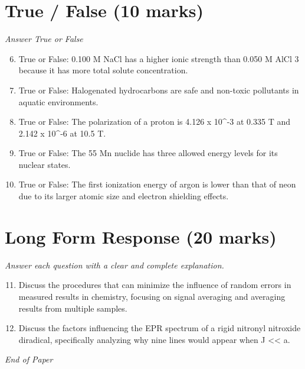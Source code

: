 \documentclass[12pt]{article}
\begin{document}
\section*{True / False (10 marks)}
\textit{Answer True or False}
\begin{enumerate}[label=\arabic*.]
\setcounter{enumi}{5}
\item True or False: 0.100 M NaCl has a higher ionic strength than 0.050 M AlCl 3 because it has more total solute concentration.
\item True or False: Halogenated hydrocarbons are safe and non-toxic pollutants in aquatic environments.
\item True or False: The polarization of a proton is 4.126 x 10^-3 at 0.335 T and 2.142 x 10^-6 at 10.5 T.
\item True or False: The 55 Mn nuclide has three allowed energy levels for its nuclear states.
\item True or False: The first ionization energy of argon is lower than that of neon due to its larger atomic size and electron shielding effects.
\end{enumerate}

\section*{Long Form Response (20 marks)}
\textit{Answer each question with a clear and complete explanation.}
\begin{enumerate}[label=\arabic*.]
\setcounter{enumi}{10}
\item Discuss the procedures that can minimize the influence of random errors in measured results in chemistry, focusing on signal averaging and averaging results from multiple samples.
\item Discuss the factors influencing the EPR spectrum of a rigid nitronyl nitroxide diradical, specifically analyzing why nine lines would appear when J \textless{}\textless{} a.
\end{enumerate}

\vfill
\noindent\textit{End of Paper}
\end{document}
